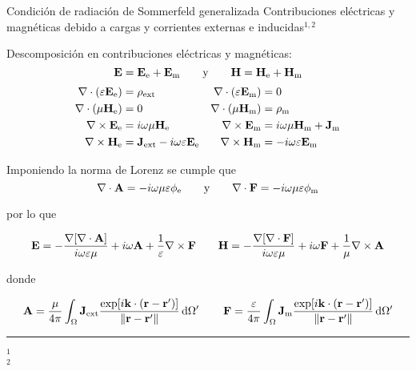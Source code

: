 \begin{frame}{Condición de radiación de Sommerfeld generalizada}
{Contribuciones eléctricas y magnéticas debido a cargas y corrientes externas e inducidas$^{1,2}$}\small

Descomposición en contribuciones eléctricas y magnéticas:
$$
\vb{E} =  \vb{E}_\text{e} +  \vb{E}_\text{m}\qquad \text{y} \qquad \vb{H} =  \vb{H}_\text{e} +  \vb{H}_\text{m}
$$
\begin{align*}
    \nabla \cdot \qty(\varepsilon \vb{E}_\text{e})  &= \rho_\text{ext}
                    &\nabla \cdot \qty(\varepsilon \vb{E}_\text{m})  &= 0\\
    \nabla \cdot  (\mu\vb{H}_\text{e})  &= 0
                    & \nabla \cdot  (\mu\vb{H}_\text{m})  &= \rho_\text{m}\\
    \nabla \times \vb{E}_\text{e}  &= i\omega \mu \vb{H}_\text{e}
                    & \nabla \times \vb{E}_\text{m}  &= i\omega \mu \vb{H}_\text{m} + \vb{J}_\text{m}\\
    \nabla \times \vb{H}_\text{e}  &= \vb{J}_\text{ext} - i\omega \varepsilon \vb{E}_\text{e}
                & \nabla \times \vb{H}_\text{m}  &=- i\omega \varepsilon \vb{E}_\text{m}
\end{align*}

Imponiendo la norma de Lorenz se cumple que
$$\nabla\cdot\vb{A} = -i\omega\mu\varepsilon \phi_\text{e}\qquad \text{y} \qquad \nabla\cdot\vb{F} = -i\omega\mu\varepsilon \phi_\text{m}$$

por lo que

\begin{align*}
    \vb{E} = - \dfrac{\nabla[\nabla\cdot\vb{A}]}{i\omega\varepsilon\mu} + i \omega\vb{A} + \dfrac{1}{\varepsilon}\nabla\times\vb{F}
    \qquad
    \vb{H} =- \dfrac{\nabla[\nabla\cdot\vb{F}]}{i\omega\varepsilon\mu} + i \omega\vb{F} + \dfrac{1}{\mu}\nabla\times\vb{A}
\end{align*}

donde

\begin{align*}
    \vb{A} = \dfrac{\mu}{4\pi} \int_\Omega \vb{J}_\text{ext}  \dfrac{\exp[i\vb{k}\cdot(\vb{r}-\vb{r}')]}{\norm{\vb{r}-\vb{r}'}}\dd{\Omega'}
    \qquad
    \vb{F} = \dfrac{\varepsilon}{4\pi} \int_\Omega \vb{J}_\text{m}  \dfrac{\exp[i\vb{k}\cdot(\vb{r}-\vb{r}')]}{\norm{\vb{r}-\vb{r}'}}\dd{\Omega'}
\end{align*}

%
	\noindent\rule{.25\textwidth}{0.4pt}
 \begin{spacing}{0}\fontsize{4}{12} \selectfont
	$^1$ \\
	$^2$ 
	\end{spacing}
\end{frame}



